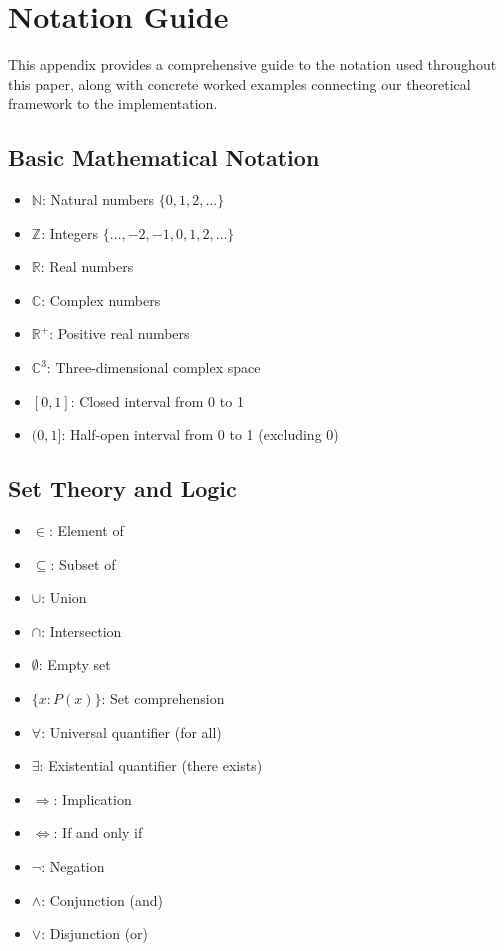 \appendix
\section{Notation Guide}
\label{app:notation}

This appendix provides a comprehensive guide to the notation used throughout this paper, along with concrete worked examples connecting our theoretical framework to the implementation.

\subsection{Basic Mathematical Notation}
\begin{itemize}
\item $\mathbb{N}$: Natural numbers $\{0, 1, 2, \ldots\}$
\item $\mathbb{Z}$: Integers $\{\ldots, -2, -1, 0, 1, 2, \ldots\}$
\item $\mathbb{R}$: Real numbers
\item $\mathbb{C}$: Complex numbers
\item $\mathbb{R}^+$: Positive real numbers
\item $\mathbb{C}^3$: Three-dimensional complex space
\item $[0,1]$: Closed interval from 0 to 1
\item $(0,1]$: Half-open interval from 0 to 1 (excluding 0)
\end{itemize}

\subsection{Set Theory and Logic}
\begin{itemize}
\item $\in$: Element of
\item $\subseteq$: Subset of
\item $\cup$: Union
\item $\cap$: Intersection
\item $\emptyset$: Empty set
\item $\{x : P(x)\}$: Set comprehension
\item $\forall$: Universal quantifier (for all)
\item $\exists$: Existential quantifier (there exists)
\item $\Rightarrow$: Implication
\item $\Leftrightarrow$: If and only if
\item $\neg$: Negation
\item $\wedge$: Conjunction (and)
\item $\vee$: Disjunction (or)
\end{itemize}

